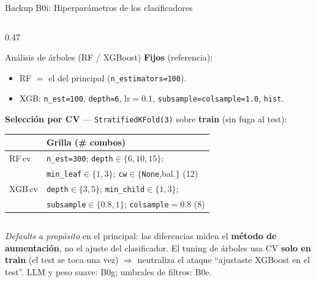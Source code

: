 \begin{frame}{Backup B0i: Hiperparámetros de los clasificadores}
\begin{columns}[T]
\begin{column}{0.47\textwidth}
\begin{block}{\small Análisis de árboles (RF / XGBoost)}
\scriptsize
\textbf{Fijos} (referencia):
\begin{itemize}\setlength\itemsep{0pt}
  \item RF $=$ el del principal (\texttt{n\_estimators=100}).
  \item XGB: \texttt{n\_est=100}, \texttt{depth=6}, lr$=0{.}1$, \texttt{subsample=colsample=1.0}, \texttt{hist}.
\end{itemize}
\vspace{3pt}
\textbf{Selección por CV} --- \texttt{StratifiedKFold(3)} sobre \textbf{train} (sin fuga al test):\\[2pt]
\setlength{\tabcolsep}{3pt}
\renewcommand{\arraystretch}{1.15}
\begin{tabular}{@{}ll@{}}
\toprule
 & Grilla (\# combos) \\
\midrule
RF\,cv  & \texttt{n\_est=300}; \texttt{depth}$\in\{6,10,15\}$; \\
        & \texttt{min\_leaf}$\in\{1,3\}$; \texttt{cw}$\in\{$\texttt{None},bal.$\}$ \hfill(12) \\
XGB\,cv & \texttt{depth}$\in\{3,5\}$; \texttt{min\_child}$\in\{1,3\}$; \\
        & \texttt{subsample}$\in\{0.8,1\}$; \texttt{colsample}$=0.8$ \hfill(8) \\
\bottomrule
\end{tabular}
\end{block}
\end{column}

\end{columns}

\vspace{0.15em}
\begin{insight}
\scriptsize \textit{Defaults a propósito} en el principal: las diferencias miden el \textbf{método de aumentación}, no el ajuste del clasificador. El tuning de árboles usa CV \textbf{solo en train} (el test se toca una vez) $\Rightarrow$ neutraliza el ataque ``ajustaste XGBoost en el test''. \;LLM y peso suave: B0g; umbrales de filtros: B0e.
\end{insight}
\end{frame}

